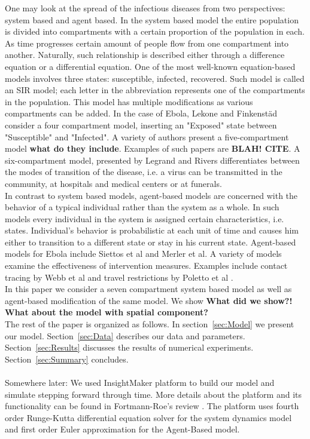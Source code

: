 \documentclass[10pt]{article}
\begin{document}
One may look at the spread of the infectious diseases from two perspectives: system based and agent based. In the system based model the entire population is divided into compartments with a certain proportion of the population in each. As time progresses certain amount of people flow from one compartment into another. Naturally, such relationship is described either through a difference equation or a differential equation. One of the most well-known equation-based models involves three states: susceptible, infected, recovered. Such model is called an SIR model; each letter in the abbreviation represents one of the compartments in the population. This model has multiple modifications as various compartments can be added. In the case of Ebola, Lekone and Finkenstäd \cite{Lekone2006} consider a four compartment model, inserting an "Exposed" state between "Susceptible" and "Infected". A variety of authors present a five-compartment model \textbf{what do they include}. Examples of such papers are \textbf{BLAH! CITE}. A six-compartment model, presented by Legrand \cite{Legrand2007} and Rivers\cite{Rivers2014} differentiates between the modes of transition of the disease, i.e. a virus can be transmitted in the community, at hospitals and medical centers or at funerals.\\
In contrast to system based models, agent-based models are concerned with the behavior of a typical individual rather than the system as a whole. In such models every individual in the system is assigned certain characteristics, i.e. states. Individual's behavior is probabilistic at each unit of time and causes him either to transition to a different state or stay in his current state. Agent-based models for Ebola include Siettos et al \cite{Siettos2015} and Merler et al\cite{Merler2015}. A variety of models examine the effectiveness of intervention measures. Examples include contact tracing by Webb et al \cite{Webb2015} and travel restrictions by Poletto et al \cite{Poletto2014}.\\
In this paper we consider a seven compartment system based model as well as agent-based modification of the same model. We show \textbf{What did we show?!} \textbf{What about the model with spatial component?}\\
The rest of the paper is organized as follows. In section~\ref{sec:Model} we present our model. Section~\ref{sec:Data} describes our data and parameters. Section~\ref{sec:Results} discusses the results of numerical experiments. Section~\ref{sec:Summary} concludes.\\\\
Somewhere later: We used InsightMaker platform to build our model and simulate stepping forward through time. More details about the platform and its functionality can be found in Fortmann-Roe's review \cite{FortmannRoe}. The platform uses fourth order Runge-Kutta differential equation solver for the system dynamics model and  first order Euler approximation for the Agent-Based model.
\\\\
\end{document}
